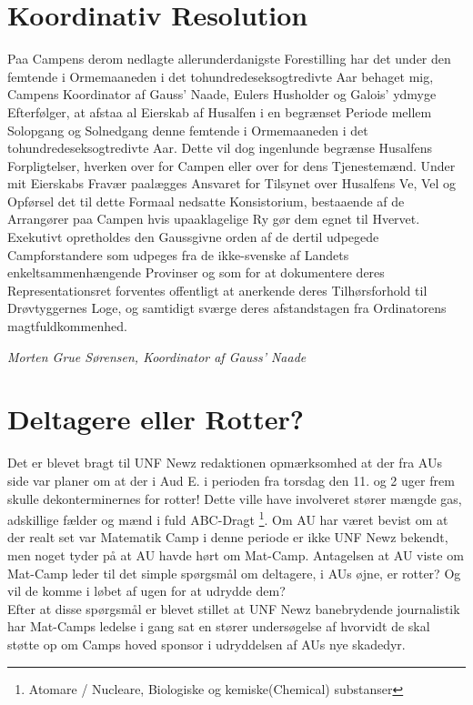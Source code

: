 

\begin{minipage}[b]{0.95\linewidth}
\begin{minipage}[t]{0.47\textwidth}
\vspace{3mm}
\section*{Koordinativ Resolution}

Paa Campens derom nedlagte allerunderdanigste Forestilling har det under den femtende i Ormemaaneden i det tohundredeseksogtredivte Aar behaget mig, Campens Koordinator af Gauss' Naade, Eulers Husholder og Galois' ydmyge Efterfølger, at afstaa al Eierskab af Husalfen i en begrænset Periode mellem Solopgang og Solnedgang denne femtende i Ormemaaneden i det tohundredeseksogtredivte Aar. Dette vil dog ingenlunde begrænse Husalfens Forpligtelser, hverken over for Campen eller over for dens Tjenestemænd. Under mit Eierskabs Fravær paalægges Ansvaret for Tilsynet over Husalfens Ve, Vel og Opførsel det til dette Formaal nedsatte Konsistorium, bestaaende af de Arrangører paa Campen hvis upaaklagelige Ry gør dem egnet til Hvervet. Exekutivt opretholdes den Gaussgivne orden af de dertil udpegede Campforstandere som udpeges fra de ikke-svenske af Landets enkeltsammenhængende Provinser og som for at dokumentere deres Representationsret forventes offentligt at anerkende deres Tilhørsforhold til Drøvtyggernes Loge, og samtidigt sværge deres afstandstagen fra Ordinatorens magtfuldkommenhed.

{\flushright\emph{Morten Grue Sørensen, Koordinator af Gauss' Naade }}

\section*{Deltagere eller Rotter?}
Det er blevet bragt til UNF Newz redaktionen opmærksomhed at der fra AUs side var planer om at der i Aud E. i perioden fra torsdag den 11. og 2 uger frem skulle dekonterminernes for rotter! Dette ville have involveret stører mængde gas, adskillige fælder og mænd i fuld ABC-Dragt \footnote{ Atomare / Nucleare, Biologiske og kemiske(Chemical) substanser}.  Om AU har været bevist om at der realt set var Matematik Camp i denne periode er ikke UNF Newz bekendt, men noget tyder på at AU havde hørt om Mat-Camp. Antagelsen at AU viste om Mat-Camp leder til det simple spørgsmål om deltagere, i AUs øjne, er rotter?
Og vil de komme i løbet af ugen for at udrydde dem? \\
Efter at disse spørgsmål er blevet stillet at UNF Newz banebrydende journalistik har Mat-Camps ledelse i gang sat en stører undersøgelse af hvorvidt de skal støtte op om Camps hoved sponsor i udryddelsen af AUs nye skadedyr.


\end{minipage}
\end{minipage}
